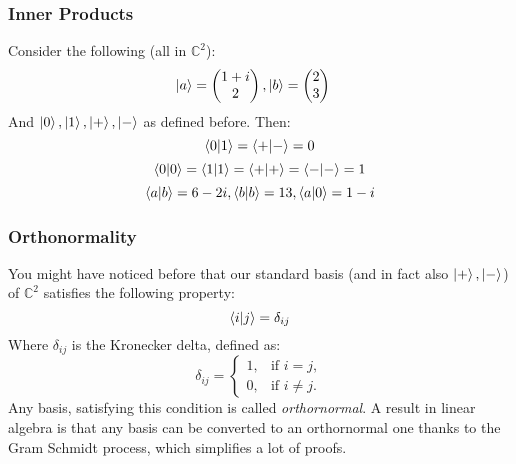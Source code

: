 \documentclass{beamer}
\begin{document}
    \begin{frame}
        \frametitle{Inner Products}
        \begin{example}
            Consider the following (all in $\mathbb{C}^2$):
            \begin{align}
                \ket{a} &= \begin{pmatrix}
                    1 + i \\
                    2
                \end{pmatrix},
                 \ket{b} = \begin{pmatrix}
                    2 \\ 
                    3
                \end{pmatrix}
            \end{align}
            And $\ket{0}, \ket{1}, \ket{+}, \ket{-}$ as defined before.
            Then:
        \begin{equation} \braket{0|1} = \braket{+| -} = 0 \end{equation} 
        \begin{equation} \braket{0|0} = \braket{1|1} =  \braket{+| +} = \braket{-| -} = 1 \end{equation}
        \begin{equation}
            \braket{a|b} = 6 - 2i, \braket{b|b} = 13, \braket{a|0} = 1-i
        \end{equation}
        \end{example}
    
    \end{frame}
    \begin{frame}
        \frametitle{Orthonormality}
        You might have noticed before that our standard basis (and in fact also $\ket{+}, \ket{-}$) of $\mathbb{C}^2$ satisfies the following property:
        \begin{equation}
            \braket{i|j} = \delta_{ij}
        \end{equation}
        Where $\delta_{ij}$ is the Kronecker delta, defined as:
        \begin{equation}
        \delta_{ij} =
                \begin{cases}
                    1, &         \text{if } i=j,\\
                    0, &         \text{if } i\neq j.
                \end{cases}
        \end{equation}
        Any basis, satisfying this condition is called \textit{orthornormal}. 
        A result in linear algebra is that any basis can be converted to an orthornormal one thanks to the Gram Schmidt process, which simplifies a lot of proofs.
    \end{frame}
\end{document}
